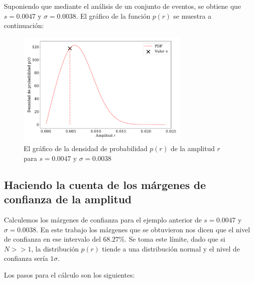 Suponiendo que mediante el análisis de un conjunto de eventos, se obtiene que $s=0.0047$ y $\sigma=0.0038$. El gráfico de la función $p(r)$ se muestra a continuación:

\begin{figure}[H]
    \begin{small}
        \begin{center}
            \includegraphics[width=0.75\textwidth]{bessel_prob_value_s_v2.pdf}
        \end{center}
        \caption{El gráfico de la densidad de probabilidad $p(r)$ de la amplitud $r$ para $s=0.0047$ y $\sigma=0.0038$ }
    \end{small}
\end{figure}

\subsection{Haciendo la cuenta de los márgenes de confianza de la amplitud}

Calculemos los márgenes de confianza para el ejemplo anterior de $s=0.0047$ y $\sigma=0.0038$. En este trabajo los márgenes que se obtuvieron nos dicen que el nivel de confianza en ese intervalo del $68.27\%$. Se toma este límite, dado que si $N>>1$, la distribución $p(r)$ tiende a una distribución normal y el nivel de confianza sería $1\sigma$.

Los pasos para el cálculo son los siguientes: 

